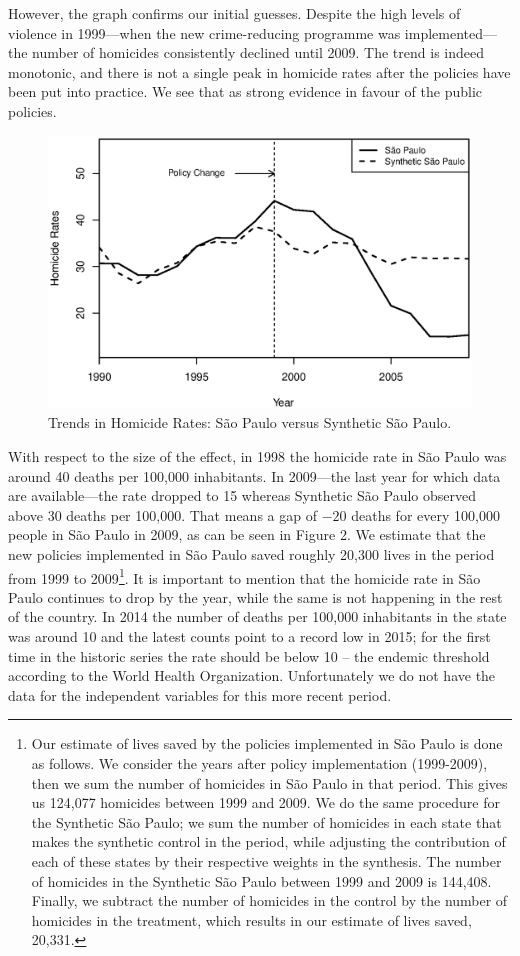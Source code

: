 \documentclass[a4paper,11pt]{article}
\begin{document}
However, the graph confirms our initial guesses. Despite the high levels of violence in 1999---when the new crime-reducing programme was implemented---the number of homicides consistently declined until 2009. The trend is indeed monotonic, and there is not a single peak in homicide rates after the policies have been put into practice. We see that as strong evidence in favour of the public policies. 

\begin{figure}[htp!]
\begin{center}
\centerline{\includegraphics[width=.6\textwidth]{trends.eps}}
\caption{Trends in Homicide Rates: S\~{a}o Paulo versus Synthetic S\~{a}o Paulo.}\label{trends}
\end{center}
\end{figure}

With respect to the size of the effect, in 1998 the homicide rate in S\~{a}o Paulo was around 40 deaths per 100,000 inhabitants. In 2009---the last year for which data are available---the rate dropped to 15 whereas Synthetic S\~{a}o Paulo observed above 30 deaths per 100,000. That means a gap of $-20$ deaths for every 100,000 people in S\~{a}o Paulo in 2009, as can be seen in Figure 2. We estimate that the new policies implemented in S\~{a}o Paulo saved roughly 20,300 lives in the period from 1999 to 2009\footnote{Our estimate of lives saved by the policies implemented in S\~{a}o Paulo is done as follows. We consider the years after policy implementation (1999-2009), then we sum the number of homicides in S\~{a}o Paulo in that period. This gives us 124,077 homicides between 1999 and 2009. We do the same procedure for the Synthetic S\~{a}o Paulo; we sum the number of homicides in each state that makes the synthetic control in the period, while adjusting the contribution of each of these states by their respective weights in the synthesis. The number of homicides in the Synthetic S\~{a}o Paulo between 1999 and 2009 is 144,408. Finally, we subtract the number of homicides in the control by the number of homicides in the treatment, which results in our estimate of lives saved, 20,331.}. It is important to mention that the homicide rate in S\~{a}o Paulo continues to drop by the year, while the same is not happening in the rest of the country. In 2014 the number of deaths per 100,000 inhabitants in the state was around 10 and the latest counts point to a record low in 2015; for the first time in the historic series the rate should be below 10 -- the endemic threshold according to the World Health Organization. Unfortunately we do not have the data for the independent variables for this more recent period.
\end{document}
